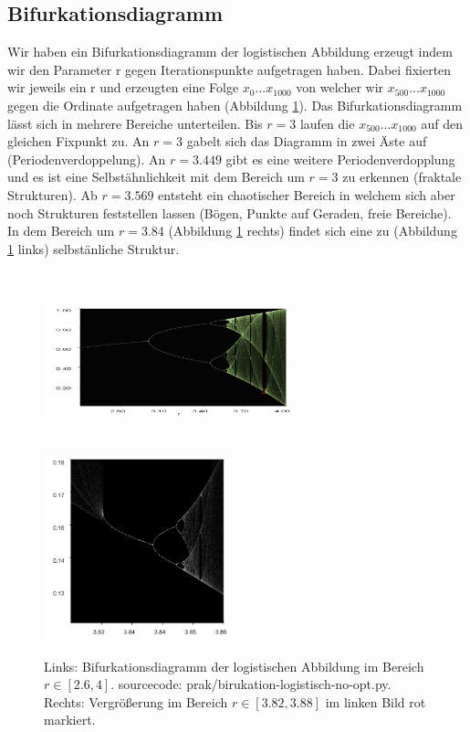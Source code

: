 \documentclass[12pt,a4paper]{article}
\begin{document}
\subsection{Bifurkationsdiagramm}
Wir haben ein Bifurkationsdiagramm der logistischen Abbildung erzeugt indem wir den Parameter r gegen Iterationspunkte aufgetragen haben. Dabei fixierten wir jeweils ein r und erzeugten eine Folge $x_0 ... x_{1000}$ von welcher wir $x_{500} ... x_{1000}$ gegen die Ordinate aufgetragen haben (Abbildung \ref{fig:bifurkation-sin-nice}).
Das Bifurkationsdiagramm lässt sich in mehrere Bereiche unterteilen. Bis $r=3$ laufen die $x_{500}...x_{1000}$ auf den gleichen Fixpunkt zu. An $r=3$ gabelt sich das Diagramm in zwei Äste auf (Periodenverdoppelung). An $r=3.449$ gibt es eine weitere Periodenverdopplung und es ist eine Selbstähnlichkeit mit dem Bereich um $r=3$ zu erkennen (fraktale Strukturen). Ab $r=3.569$ entsteht ein chaotischer Bereich in welchem sich aber noch Strukturen feststellen lassen (Bögen, Punkte auf Geraden, freie Bereiche). 
In dem Bereich um $r=3.84$ (Abbildung \ref{fig:bifurkation-sin-nice} rechts) findet sich eine zu (Abbildung \ref{fig:bifurkation-sin-nice} links) selbstänliche Struktur. 

\begin{figure}[!htbp]
	\centering
	\includegraphics[width=270px, height=200px]{bifurkation-1}
	\includegraphics[width=200px, height=200px]{bifurk-zoom-jo}
	\caption{Links: Bifurkationsdiagramm der logistischen Abbildung im Bereich $r\in[2.6,4]$. sourcecode: prak/birukation-logistisch-no-opt.py. Rechts: Vergrößerung im Bereich $r \in [3.82,3.88]$ im linken Bild rot markiert.}
	\label{fig:bifurkation-sin-nice}
\end{figure}
\end{document}
